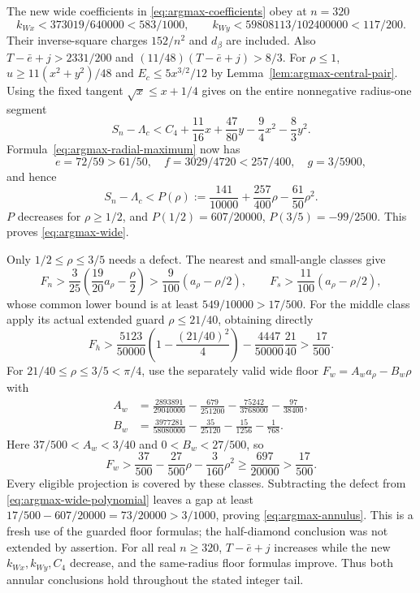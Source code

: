 The new wide coefficients in \eqref{eq:argmax-coefficients} obey at
$n=320$
\[
 k_{Wx}<373019/640000<583/1000,\qquad
 k_{Wy}<59808113/102400000<117/200.
\]
Their inverse-square charges $152/n^2$ and $d_\beta$ are included.
Also $T-\bar e+j>2331/200$ and
$(11/48)(T-\bar e+j)>8/3$.  For $\rho\leq1$,
$u\geq11(x^2+y^2)/48$ and
$E_c\leq5x^{3/2}/12$ by Lemma~\ref{lem:argmax-central-pair}.
Using the fixed tangent $\sqrt x\leq x+1/4$ gives on the entire
nonnegative radius-one segment
\[
 S_n-\Lambda_c<C_4+\frac{11}{16}x+\frac{47}{80}y
                         -\frac94x^2-\frac83y^2.
\]
Formula~\eqref{eq:argmax-radial-maximum} now has
\[
 e=72/59>61/50,\quad f=3029/4720<257/400,\quad g=3/5900,
\]
and hence
\begin{equation}
 S_n-\Lambda_c<P(\rho):=
 \frac{141}{10000}+\frac{257}{400}\rho-\frac{61}{50}\rho^2.
                                                        \label{eq:argmax-wide-polynomial}
\end{equation}
$P$ decreases for $\rho\geq1/2$, and
$P(1/2)=607/20000$, $P(3/5)=-99/2500$.  This proves
\eqref{eq:argmax-wide}.

Only $1/2\leq\rho\leq3/5$ needs a defect.  The nearest and small-angle
classes give
\[
 F_n>\frac3{25}\left(\frac{19}{20}a_\rho-\frac\rho2\right)
       >\frac9{100}(a_\rho-\rho/2),\qquad
 F_s>\frac{11}{100}(a_\rho-\rho/2),
\]
whose common lower bound is at least $549/10000>17/500$.
For the middle class apply its actual extended guard
$\rho\leq21/40$, obtaining directly
\[
 F_h>\frac{5123}{50000}\left(1-\frac{(21/40)^2}{4}\right)
             -\frac{4447}{50000}\frac{21}{40}>\frac{17}{500}.
\]
For $21/40\leq\rho\leq3/5<\pi/4$, use the separately valid wide
floor $F_w=A_w a_\rho-B_w\rho$ with
\begin{align*}
 A_w&=\frac{2893891}{29040000}-\frac{679}{251200}
                    -\frac{75242}{3768000}-\frac{97}{38400},\\
 B_w&=\frac{3977281}{58080000}-\frac{35}{25120}
                    -\frac{15}{1256}-\frac1{768}.
\end{align*}
Here $37/500<A_w<3/40$ and $0<B_w<27/500$, so
\[
 F_w>\frac{37}{500}-\frac{27}{500}\rho-\frac3{160}\rho^2
       \geq\frac{697}{20000}>\frac{17}{500}.
\]
Every eligible projection is covered by these classes.  Subtracting
the defect from \eqref{eq:argmax-wide-polynomial} leaves a gap at least
$17/500-607/20000=73/20000>3/1000$, proving
\eqref{eq:argmax-annulus}.  This is a fresh use of the guarded floor
formulas; the half-diamond conclusion was not extended by assertion.
For all real $n\geq320$, $T-\bar e+j$ increases while the new
$k_{Wx},k_{Wy},C_4$ decrease, and the same-radius floor formulas improve.
Thus both annular conclusions hold throughout the stated integer tail.


